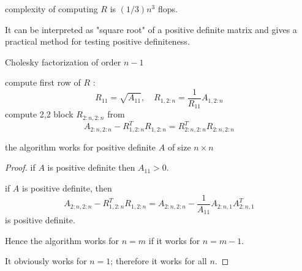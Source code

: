 complexity of computing $ R $ is $ (1 / 3) n^{3} $ flops.

It can be interpreted as "square root" of a positive definite matrix and gives a practical method for testing positive definiteness.

\begin{algorithm}
    \caption{Cholesky factorization of order $ n-1 $}
    \KwIn{\begin{equation} \begin{aligned}\left[\begin{array}{cc}A_{11} & A_{1,2: n} \\ A_{2: n, 1} & A_{2: n, 2: n}\end{array}\right] &=\left[\begin{array}{cc}R_{11} & 0 \\ R_{1,2: n}^{T} & R_{2: n, 2: n}^{T}\end{array}\right]\left[\begin{array}{cc}R_{11} & R_{1,2: n} \\ 0 & R_{2: n, 2: n}\end{array}\right] \\ &=\left[\begin{array}{cc}R_{11}^{2} & R_{11} R_{1,2: n} \\ R_{11} R_{1,2: n}^{T} & R_{1,2: n}^{T} R_{1,2: n}+R_{2: n, 2: n}^{T} R_{2: n, 2: n}\end{array}\right] \end{aligned} \end{equation}}
    
compute first row of $ R $ :
\begin{equation}
R_{11}=\sqrt{A_{11}}, \quad R_{1,2: n}=\frac{1}{R_{11}} A_{1,2: n}
\end{equation}\;
compute 2,2 block $ R_{2: n, 2: n} $ from
\begin{equation}
A_{2: n, 2: n}-R_{1,2: n}^{T} R_{1,2: n}=R_{2: n, 2: n}^{T} R_{2: n, 2: n}
\end{equation}

\end{algorithm}

\begin{proposition}
    the algorithm works for positive definite $ A $ of size $ n \times n $
\end{proposition}

\begin{proof}
    if $ A $ is positive definite then $ A_{11}>0 $.

    if $ A $ is positive definite, then
\begin{equation}
A_{2: n, 2: n}-R_{1,2: n}^{T} R_{1,2: n}=A_{2: n, 2: n}-\frac{1}{A_{11}} A_{2: n, 1} A_{2: n, 1}^{T}
\end{equation}
is positive definite.

Hence the algorithm works for $ n=m $ if it works for $ n=m-1 $.

It obviously works for $ n=1 $; therefore it works for all $ n $.
\end{proof}


